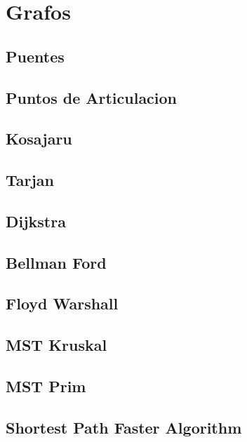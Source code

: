 \section{Grafos}
\subsection{Puentes}
\raggedbottom
\hrulefill
\subsection{Puntos de Articulacion}
\raggedbottom
\hrulefill
\subsection{Kosajaru}
\raggedbottom
\hrulefill
\subsection{Tarjan}
\raggedbottom
\hrulefill
\subsection{Dijkstra}
\raggedbottom
\hrulefill
\subsection{Bellman Ford}
\raggedbottom
\hrulefill
\subsection{Floyd Warshall}
\raggedbottom
\hrulefill
\subsection{MST Kruskal}
\raggedbottom
\hrulefill
\subsection{MST Prim}
\raggedbottom
\hrulefill
\subsection{Shortest Path Faster Algorithm}
\raggedbottom
\hrulefill
